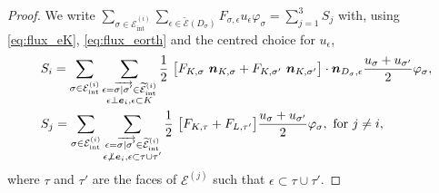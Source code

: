 \documentclass{amsart}
\numberwithin{equation}{section}
\begin{document}
\begin{proof} We write  $ \sum_{{{\sigma}} \in {{\mathcal E}_{\mathrm{int}}^{(i)}}} \sum_{{\epsilon} \in {\widetilde {{\mathcal E}}}(D_{{\sigma}})}
F_{{{\sigma}},{\epsilon}} u_{\epsilon} \varphi_{{\sigma}}=    \sum_{j=1}^3 S_{j}$  with, using \eqref{eq:flux_eK}, \eqref{eq:flux_eorth} and the centred choice for $u_{\epsilon}$,
  \begin{align*}
&   S_i = \sum_{{{\sigma}} \in {{\mathcal E}_{\mathrm{int}}^{(i)}}} \sum_{\substack{{\epsilon} = \overrightarrow{{{\sigma}} | {{\sigma}}'} \in{{{\widetilde {{\mathcal E}}}^{(i)}_{{\rm int}}}} \\ {\epsilon}\perp{{\boldsymbol e}}_{i}, {\epsilon} \subset K}}
    \frac 1 2 \ \bigl[ F_{K,{{\sigma}}}\ {{\boldsymbol n}}_{K,{{\sigma}}} 
+ F_{K,{{\sigma}}'}\ {{\boldsymbol n}}_{K,{{\sigma}}'}  \bigr] \cdot {{\boldsymbol n}}_{D_{{\sigma}},{\epsilon}}
    \frac {u_{{\sigma}} + u_{{{\sigma}}'}}{2}\varphi_{{\sigma}},
\\
&    S_j =\sum_{{{\sigma}} \in {{\mathcal E}_{\mathrm{int}}^{(i)}}}  \sum_{\substack{{\epsilon}= \overrightarrow{{{\sigma}} | {{\sigma}}'} \in{{{\widetilde {{\mathcal E}}}^{(i)}_{{\rm int}}}}\\ {\epsilon} \not\perp{{\boldsymbol e}}_{i}, {\epsilon} \subset {\tau}\cup{\tau}'}}  \frac 1 2\ \bigl[F_{K,{\tau}}+ F_{L,{\tau}'} \bigr]  \frac {u_{{\sigma}} + u_{{{\sigma}}'}}{2} \varphi_{{\sigma}},
\textrm{ for } j\ne i,
 \end{align*}
  where ${\tau}$ and ${\tau}'$ are the faces of ${\mathcal {E}^{(j)}}$ such that ${\epsilon} \subset {\tau} \cup {\tau}'$.
  

\end{proof}
\end{document}
